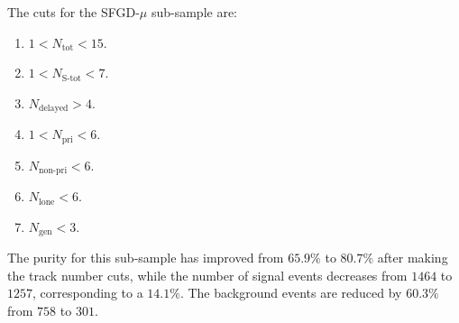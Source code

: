The cuts for the SFGD-$\mu$ sub-sample are:
\begin{enumerate}
    \item $1<N_{\textrm{tot}}<15$.
    \item $1<N_{\textrm{S-tot}}<7$.
    \item $N_{\textrm{delayed}}>4$.
    \item $1<N_{\textrm{pri}}<6$.
    \item $N_{\textrm{non-pri}}<6$.
    \item $N_{\textrm{lone}}<6$.
    \item $N_{\textrm{gen}}<3$.
\end{enumerate}
The purity for this sub-sample has improved from $65.9\%$ to $80.7\%$ after making the track number cuts, while the number of signal events decreases from $1464$ to $1257$, corresponding to a $14.1\%$.
The background events are reduced by $60.3\%$ from $758$ to $301$.

